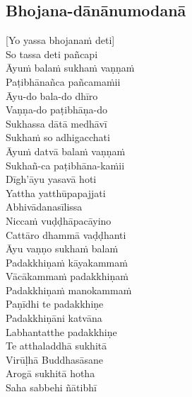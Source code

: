 \suttaRef{[Thai]}

\subsection{Bhojana-dānānumodanā}
\label{bhojana-dananumodana}

[Yo yassa bhojanaṁ deti]\\
So tassa deti pañcapi\\
Āyuṁ balaṁ sukhaṁ vaṇṇaṁ\\
Paṭibhānañca pañcamaṁii\\
Āyu-do bala-do dhīro\\
Vaṇṇa-do paṭibhāṇa-do\\
Sukhassa dātā medhāvī\\
Sukhaṁ so adhigacchati\\
Āyuṁ datvā balaṁ vaṇṇaṁ\\
Sukhañ-ca paṭibhāna-kaṁii\\
Dīgh'āyu yasavā hoti\\
Yattha yatthūpapajjati\\
Abhivādanasīlissa\\
Niccaṁ vuḍḍhāpacāyino\\
Cattāro dhammā vaḍḍhanti\\
Āyu vaṇṇo sukhaṁ balaṁ\\
Padakkhiṇaṁ kāyakammaṁ\\
Vācākammaṁ padakkhiṇaṁ\\
Padakkhiṇaṁ manokammaṁ\\
Paṇīdhi te padakkhiṇe\\
Padakkhiṇāni katvāna\\
Labhantatthe padakkhiṇe\\
Te atthaladdhā sukhitā\\
Virūḷhā Buddhasāsane\\
Arogā sukhitā hotha\\
Saha sabbehi ñātibhī

